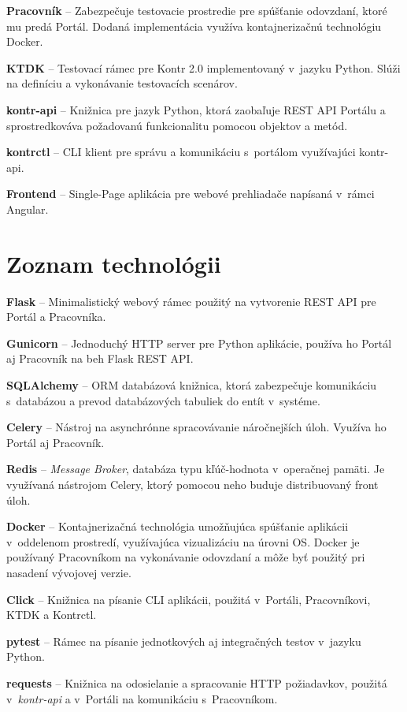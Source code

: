 \documentclass[
  digital, %
  oneside, %
  table,   %
  lof,     %
  lot,   %
]{fithesis3}
\begin{document}
\textbf{Pracovník} -- Zabezpečuje testovacie prostredie pre spúšťanie odovzdaní, ktoré mu predá Portál. Dodaná implementácia využíva kontajnerizačnú technológiu Docker.

\textbf{KTDK} -- Testovací rámec pre Kontr 2.0 implementovaný v~jazyku Python. Slúži na definíciu a vykonávanie testovacích scenárov.

\textbf{kontr-api} -- Knižnica pre jazyk Python, ktorá zaobaľuje REST API Portálu a sprostredkováva požadovanú funkcionalitu pomocou objektov a metód.

\textbf{kontrctl} -- CLI klient pre správu a komunikáciu s~portálom využívajúci kontr-api.

\textbf{Frontend} -- Single-Page aplikácia pre webové prehliadače napísaná v~rámci Angular.



\chapter{Zoznam technológii}

\hspace{\parindent}\textbf{Flask} -- Minimalistický webový rámec použitý na vytvorenie REST API pre Portál a Pracovníka.

\textbf{Gunicorn} -- Jednoduchý HTTP server pre Python aplikácie, používa ho Portál aj Pracovník na beh Flask REST API.

\textbf{SQLAlchemy} -- ORM databázová knižnica, ktorá zabezpečuje komunikáciu s~databázou a prevod databázových tabuliek do entít v~systéme.

\textbf{Celery} -- Nástroj na asynchrónne spracovávanie náročnejších úloh. Využíva ho Portál aj Pracovník.

\textbf{Redis} -- \emph{Message Broker}, databáza typu kľúč-hodnota v~operačnej pamäti. Je využívaná nástrojom Celery, ktorý pomocou neho buduje distribuovaný front úloh.

\textbf{Docker} -- Kontajnerizačná technológia umožňujúca spúšťanie aplikácii v~oddelenom prostredí, využívajúca vizualizáciu na úrovni OS. Docker je používaný Pracovníkom na vykonávanie odovzdaní a môže byť použitý pri nasadení vývojovej verzie.

\textbf{Click} -- Knižnica na písanie CLI aplikácii, použitá v~Portáli, Pracovníkovi, KTDK a Kontrctl.

\textbf{pytest} -- Rámec na písanie jednotkových aj integračných testov v~jazyku Python.

\textbf{requests} -- Knižnica na odosielanie a spracovanie HTTP požiadavkov, použitá v~\emph{kontr-api} a v~Portáli na komunikáciu s~Pracovníkom.
\end{document}
